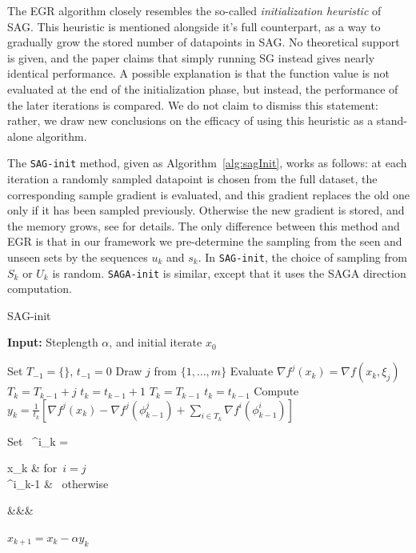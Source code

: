 \documentclass[11pt]{article}
\begin{document}
 The EGR algorithm closely resembles the so-called \emph{initialization heuristic} of SAG. This heuristic is mentioned alongside it's full counterpart, as a way to gradually grow the stored number of datapoints in SAG. No theoretical support is given, and the paper claims that simply running SG instead gives nearly identical performance. A possible explanation is that the function value is not evaluated at the end of the initialization phase, but instead, the performance of the later iterations is compared. We do not claim to dismiss this statement: rather, we draw new conclusions on the efficacy of using this heuristic as a stand-alone algorithm. 
 
 The \texttt{SAG-init} method, given as Algorithm~\ref{alg:sagInit}, works as follows: at each iteration a randomly sampled datapoint is chosen from the full dataset, the corresponding sample gradient is evaluated, and this gradient replaces the old one only if it has been sampled previously. Otherwise the new gradient is stored, and the memory grows, see \cite{roux2012stochastic} for details. The only difference between this method and EGR is that in our framework we pre-determine the sampling from the seen and unseen sets by the sequences $u_k$ and $s_k$. In \texttt{SAG-init}, the choice of sampling from $S_k$ or $U_k$ is random. \texttt{SAGA-init} is similar, except that it uses the SAGA direction computation. 

\bigskip
\begin{algorithm}
	[H] 
	\caption{SAG-init}
	\label{alg:sagInit}
	{\bf Input:} Steplength $ \alpha $, and initial iterate $x_0$
	\begin{algorithmic}
		[1] 
		\State Set $T_{-1} = \{\}$, $t_{-1} = 0$ 
		\State Draw $j$ from $\{ 1, \ldots ,m\}$ 
		\State Evaluate $\nabla f^j(x_k) = \nabla f(x_k, \xi_j) $
		\State $T_{k} = T_{k-1}+j$
		\State $t_{k}=t_{k-1}+1$
		\Else
		\State $T_{k} = T_{k-1}$
		\State $t_{k}=t_{k-1}$
		\EndIf 
           \State Compute $y_k =  \frac{1}{t_k} \left[ \nabla f^j(x_k) -  \nabla f^j(\phi_{k-1}^j) + \sum_{i \in T_k}  \nabla f^i (\phi^i_{k-1}) \right]$
		\State \begin{flalign}   \mbox{Set   }  \phi^i_k =
		\begin{cases} 
  x_k & \mbox{for $i =j$ } \\
  \phi^i_{k-1} & \mbox{ otherwise} 
 \end{cases}&&&
\end{flalign}
		\State $x_{k+1} = x_k - \alpha y_k$ 
		\EndLoop 
	\end{algorithmic}
\end{algorithm}
\end{document}
